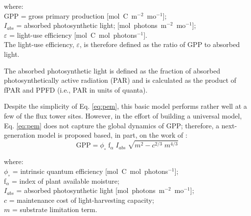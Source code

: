\noindent where:\\
\indent GPP = gross primary production [mol~C~m$^{-2}$~mo$^{-1}$];\\
\indent $I_{abs}$ = absorbed photosynthetic light; [mol~photons~m$^{-2}$~mo$^{-1}$];\\
\indent $\varepsilon$ = light-use efficiency [mol~C~mol~photons$^{-1}$].\\

\noindent The light-use efficiency, $\varepsilon$, is therefore defined as the ratio of GPP to absorbed light. 

The absorbed photosynthetic light is defined as the fraction of absorbed photosynthetically active radiation (PAR) and is calculated as the product of fPAR and PPFD (i.e., PAR in units of quanta).

Despite the simplicity of Eq. \ref{eq:pem}, this basic model performs rather well at a few of the flux tower sites. However, in the effort of building a universal model, Eq. \ref{eq:pem} does not capture the global dynamics of GPP; therefore, a next-generation model is proposed based, in part, on the work of \cite{wang12}:
\begin{equation}
\label{eq:nglue}
    \text{GPP} = \phi_{\circ}\; \text{f}_\alpha\; I_{abs}\; \sqrt{m^2 - c^{2/3}\; m^{4/3}}
\end{equation}

\noindent where:\\
\indent $\phi_{\circ}$ = intrinsic quantum efficiency [mol~C~mol~photons$^{-1}$];\\
\indent f$_\alpha$ = index of plant available moisture;\\
\indent $I_{abs}$ = absorbed photosynthetic light [mol~photons~m$^{-2}$~mo$^{-1}$];\\
\indent $c$ = maintenance cost of light-harvesting capacity;\\
\indent $m$ = substrate limitation term.\\
